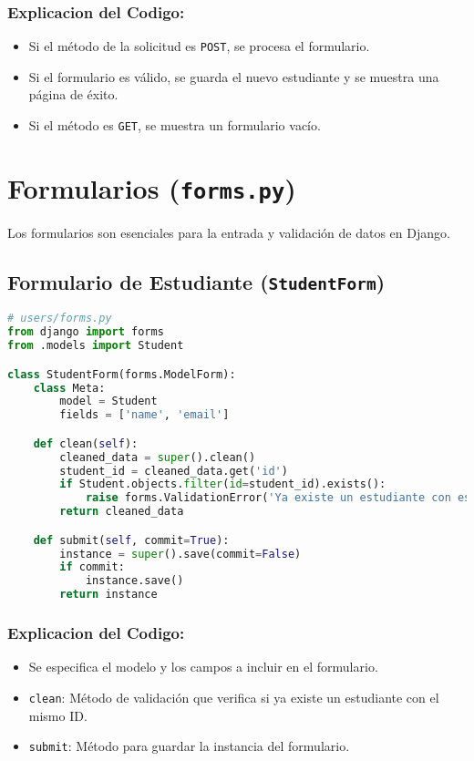 \subsubsection{Explicacion del Codigo: }

\begin{itemize}
\item Si el método de la solicitud es \texttt{POST}, se procesa el formulario.
\item Si el formulario es válido, se guarda el nuevo estudiante y se muestra una página de éxito.
\item Si el método es \texttt{GET}, se muestra un formulario vacío.
\end{itemize}

\section{Formularios (\texttt{forms.py})}

Los formularios son esenciales para la entrada y validación de datos en Django.

\subsection{Formulario de Estudiante (\texttt{StudentForm})}

\begin{lstlisting}[language=Python, caption=Formulario de Estudiante]
# users/forms.py
from django import forms
from .models import Student

class StudentForm(forms.ModelForm):
    class Meta:
        model = Student
        fields = ['name', 'email']

    def clean(self):
        cleaned_data = super().clean()
        student_id = cleaned_data.get('id')
        if Student.objects.filter(id=student_id).exists():
            raise forms.ValidationError('Ya existe un estudiante con ese id')
        return cleaned_data

    def submit(self, commit=True):
        instance = super().save(commit=False)
        if commit:
            instance.save()
        return instance
\end{lstlisting}

\subsubsection{Explicacion del Codigo: }

\begin{itemize}
\item Se especifica el modelo y los campos a incluir en el formulario.
\item \texttt{clean}: Método de validación que verifica si ya existe un estudiante con el mismo ID.
\item \texttt{submit}: Método para guardar la instancia del formulario.
\end{itemize}

